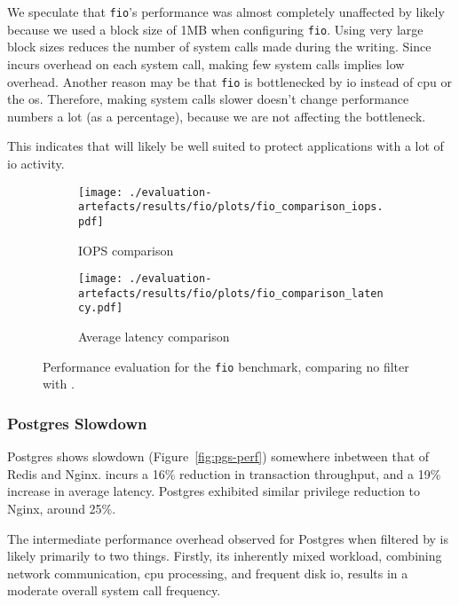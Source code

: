 We speculate that \texttt{fio}'s performance was almost completely
unaffected by \af likely because we used a block size of 1MB when
configuring \texttt{fio}. Using very large block sizes reduces the number of
system calls made during the writing. Since \af incurs overhead on each
system call, making few system calls implies low overhead. Another reason
may be that \texttt{fio} is bottlenecked by \ac{io} instead of \ac{cpu} or
the \ac{os}. Therefore, making system calls slower doesn't change performance
numbers a lot (as a percentage), because we are not affecting the bottleneck.

This indicates that \af will likely be well suited to protect applications with
a lot of \ac{io} activity.

\begin{figure}[htbp]
    \centering
    \begin{subfigure}[b]{0.48\textwidth}
        \centering
        \texttt{[image: ./evaluation-artefacts/results/fio/plots/fio\_comparison\_iops.pdf]}
        \caption{IOPS comparison}
        \label{fig:fio-iops}
    \end{subfigure}
    \hfill %
    \begin{subfigure}[b]{0.48\textwidth}
        \centering
        \texttt{[image: ./evaluation-artefacts/results/fio/plots/fio\_comparison\_latency.pdf]}
        \caption{Average latency comparison}
        \label{fig:fio-latency}
    \end{subfigure}

    \medskip %
    
    \caption{Performance evaluation for the \texttt{fio} benchmark, comparing no
    filter with \af{}.} %
    \label{fig:fio-perf}
\end{figure}

\subsubsection{Postgres Slowdown}\label{subsubsec:postgres-slowdown}

Postgres shows slowdown (Figure~\ref{fig:pgs-perf}) somewhere inbetween that
of Redis and Nginx. \af incurs a 16\% reduction in transaction throughput, and
a 19\% increase in average latency. Postgres exhibited similar privilege
reduction to Nginx, around 25\%. 

The intermediate performance overhead observed for Postgres when filtered
by \af is likely primarily to two things. Firstly, its inherently  mixed
workload, combining network communication, \ac{cpu} processing, and frequent
disk \ac{io}, results in a moderate overall system call frequency. 

